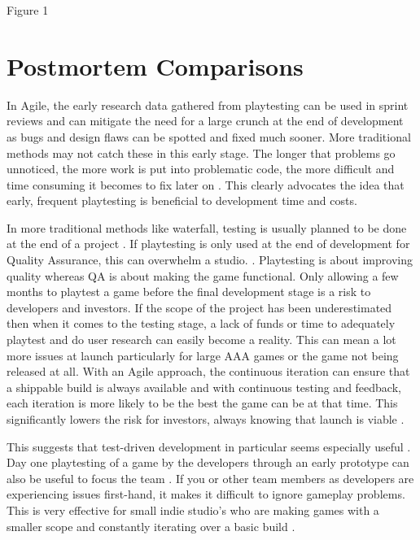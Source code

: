 \documentclass{scrartcl}
\begin{document}
\begin{center}
Figure 1 \cite{GDCAttn:3}
\end{center}

\section{Postmortem Comparisons}

In Agile, the early research data gathered from playtesting can be used in sprint reviews and can mitigate the need for a large crunch at the end of development as bugs and design flaws can be spotted and fixed much sooner\cite{PMKOA:4}. More traditional methods may not catch these in this early stage. The longer that problems go unnoticed, the more work is put into problematic code, the more difficult and time consuming it becomes to fix later on \cite{GDCOTC:5}. This clearly advocates the idea that early, frequent playtesting is beneficial to development time and costs. \par
In more traditional methods like waterfall, testing is usually planned to be done at the end of a project \cite{ji2011comparing:6}. If playtesting is only used at the end of development for Quality Assurance, this can overwhelm a studio.  \cite{PMTrine:7}. Playtesting is about improving quality whereas QA is about making the game functional. Only allowing a few months to playtest a game before the final development stage is a risk to developers and investors. If the scope of the project has been underestimated then when it comes to the testing stage, a lack of funds or time to adequately playtest and do user research can easily become a reality\cite{PMZZ:8}. This can mean a lot more issues at launch particularly for large AAA games \cite{BrokenGames:9} or the game not being released at all. With an Agile approach, the continuous iteration can ensure that a shippable build is always available and with continuous testing and feedback, each iteration is more likely to be the best the game can be at that time. This significantly lowers the risk for investors, always knowing that launch is viable \cite{ghane2017quantitative:10}. \par
This suggests that test-driven development in particular seems especially useful \cite{cunningham2005costs:11}.
Day one playtesting of a game by the developers through an early prototype can also be useful to focus the team \cite{Yampolsky:2016:LGD:2896958.2896965:12}. If you or other team members as developers are experiencing issues first-hand, it makes it difficult to ignore gameplay problems. This is very effective for small indie studio's who are making games with a smaller scope and constantly iterating over a basic build \cite{PMNS2:13}.
\end{document}
